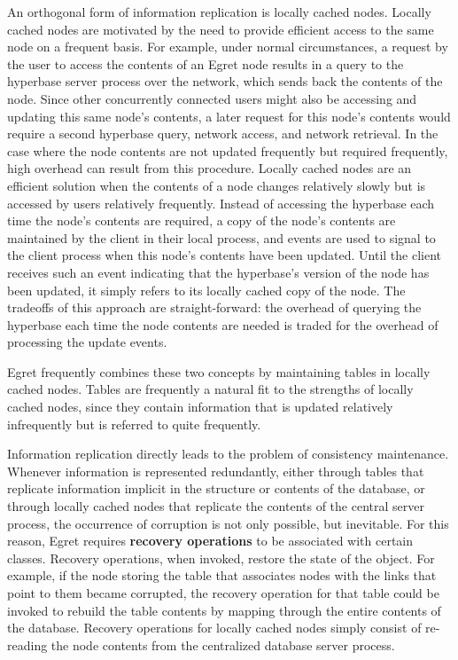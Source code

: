 An orthogonal form of information replication is locally cached nodes.
Locally cached nodes are motivated by the need to provide efficient
access to the same node on a frequent basis.  For example, under
normal circumstances, a request by the user to access the contents of
an Egret node results in a query to the hyperbase server process over
the network, which sends back the contents of the node.  Since other
concurrently connected users might also be accessing and updating this
same node's contents, a later request for this node's contents would
require a second hyperbase query, network access, and network
retrieval.  In the case where the node contents are not updated
frequently but required frequently, high overhead can result from this
procedure.  Locally cached nodes are an efficient solution when the
contents of a node changes relatively slowly but is accessed by users
relatively frequently.  Instead of accessing the hyperbase each time
the node's contents are required, a copy of the node's contents are
maintained by the client in their local process, and events are used
to signal to the client process when this node's contents have been
updated.  Until the client receives such an event indicating that the
hyperbase's version of the node has been updated, it simply refers to
its locally cached copy of the node.  The tradeoffs of this approach
are straight-forward: the overhead of querying the hyperbase each time
the node contents are needed is traded for the overhead of processing
the update events.

Egret frequently combines these two concepts by maintaining tables in
locally cached nodes.  Tables are frequently a natural fit to the
strengths of locally cached nodes, since they contain information that
is updated relatively infrequently but is referred to quite
frequently.

Information replication directly leads to the problem of consistency
maintenance.  Whenever information is represented redundantly, either
through tables that replicate information implicit in the structure or
contents of the database, or through locally cached nodes that
replicate the contents of the central server process, the occurrence
of corruption is not only possible, but inevitable.  For this reason,
Egret requires {\bf recovery operations} to be associated with certain
classes.  Recovery operations, when invoked, restore the state of the
object.  For example, if the node storing the table that associates
nodes with the links that point to them became corrupted, the recovery
operation for that table could be invoked to rebuild the table
contents by mapping through the entire contents of the database.
Recovery operations for locally cached nodes simply consist of
re-reading the node contents from the centralized database server
process.



